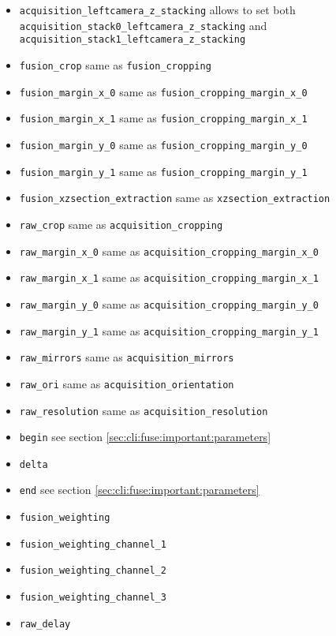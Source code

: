 \begin{itemize}
\item \texttt{acquisition\_leftcamera\_z\_stacking}
  allows to set both \texttt{acquisition\_stack0\_leftcamera\_z\_stacking} and \texttt{acquisition\_stack1\_leftcamera\_z\_stacking}
\item \texttt{fusion\_crop} 
  same as \texttt{fusion\_cropping}
\item \texttt{fusion\_margin\_x\_0}
  same as \texttt{fusion\_cropping\_margin\_x\_0}
\item \texttt{fusion\_margin\_x\_1}
  same as \texttt{fusion\_cropping\_margin\_x\_1}
\item \texttt{fusion\_margin\_y\_0}
  same as \texttt{fusion\_cropping\_margin\_y\_0}
\item \texttt{fusion\_margin\_y\_1}
  same as \texttt{fusion\_cropping\_margin\_y\_1}
\item \texttt{fusion\_xzsection\_extraction} 
  same as \texttt{xzsection\_extraction}
\item \texttt{raw\_crop} 
  same as \texttt{acquisition\_cropping}
\item \texttt{raw\_margin\_x\_0}
  same as \texttt{acquisition\_cropping\_margin\_x\_0}
\item \texttt{raw\_margin\_x\_1}
  same as \texttt{acquisition\_cropping\_margin\_x\_1}
\item \texttt{raw\_margin\_y\_0}
  same as \texttt{acquisition\_cropping\_margin\_y\_0}
\item \texttt{raw\_margin\_y\_1}
  same as \texttt{acquisition\_cropping\_margin\_y\_1}
\item \texttt{raw\_mirrors} 
  same as \texttt{acquisition\_mirrors}
\item \texttt{raw\_ori} 
  same as \texttt{acquisition\_orientation}
\item \texttt{raw\_resolution} 
  same as \texttt{acquisition\_resolution}
\end{itemize}

\begin{itemize}
\itemsep -0.5ex

\item \texttt{begin} 
  see section \ref{sec:cli:fuse:important:parameters}
\item \texttt{delta}
\item \texttt{end} 
  see section \ref{sec:cli:fuse:important:parameters}
\item \texttt{fusion\_weighting}
\item \texttt{fusion\_weighting\_channel\_1}
\item \texttt{fusion\_weighting\_channel\_2}
\item \texttt{fusion\_weighting\_channel\_3}
\item \texttt{raw\_delay}
\end{itemize}





